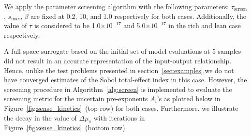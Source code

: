 We apply the parameter screening algorithm with the following
parameters: $\tau_\text{screen}$,
$s_\text{max}$, $\beta$ are fixed at 0.2, 10, and 1.0 respectively for both cases.
Additionally, the value of $\tau$ is considered to be 1.0$\times 10^{-17}$ and
5.0$\times 10^{-17}$ in the rich and lean case respectively.
~ 

A full-space surrogate based on the initial set of model evaluations at 5 samples
did not result in an accurate representation of the input-output relationship. 
Hence, unlike the test problems presented in section~\ref{sec:examples},we do not
have converged estimates of the Sobol total-effect index in this case. 
However,
the screening procedure in Algorithm~\ref{alg:screen} is implemented to evaluate
the screening metric for the uncertain pre-exponents $A_i$'s as plotted below
in Figure~\ref{fig:sense_kinetics}~(top row) for both cases. Furthermore, we illustrate
the decay in the value of $\Delta\mu_s$ with iterations in 
Figure~\ref{fig:sense_kinetics}~(bottom row).

